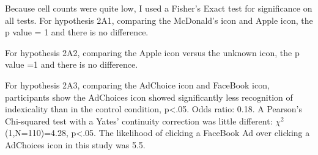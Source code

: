 Because cell counts were quite low, I used a Fisher's Exact test for significance on all tests. For hypothesis 2A1, comparing the McDonald's icon and Apple icon, the p value = 1 and there is no difference. 

For hypothesis 2A2, comparing the Apple icon versus the unknown icon, the p value =1 and there is no difference.

For hypothesis 2A3, comparing the AdChoice icon and FaceBook icon, participants show the AdChoices icon showed significantly less recognition of indexicality than in the control condition, p<.05. Odds ratio: 0.18. A Pearson's Chi-squared test with a Yates' continuity correction was little different: $\chi^2$ (1,N=110)=4.28, p<.05. The likelihood of clicking a FaceBook Ad over clicking a AdChoices icon in this study was 5.5. 
